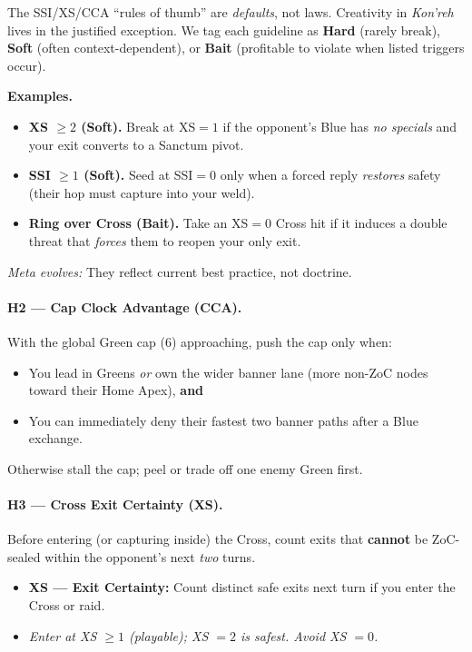 \documentclass[11pt]{article}
\begin{document}
\begin{tcolorbox}[enhanced,breakable,title={Designer Note — Heuristics Are Handles, Not Handcuffs},
  colback=white,colframe=royal,boxrule=0.8pt]
\small
The SSI/XS/CCA “rules of thumb” are \emph{defaults}, not laws. Creativity in \textit{Kon'reh} lives in the justified exception.
We tag each guideline as \textbf{Hard} (rarely break), \textbf{Soft} (often context-dependent), or \textbf{Bait} (profitable to violate when listed triggers occur).

\textbf{Examples.}
\begin{itemize}[leftmargin=1.2em,itemsep=0.2em]
  \item \textbf{XS $\ge 2$ (Soft).} Break at XS$=1$ if the opponent’s Blue has \emph{no specials} and your exit converts to a Sanctum pivot.
  \item \textbf{SSI $\ge 1$ (Soft).} Seed at SSI$=0$ only when a forced reply \emph{restores} safety (their hop must capture into your weld).
  \item \textbf{Ring over Cross (Bait).} Take an XS$=0$ Cross hit if it induces a double threat that \emph{forces} them to reopen your only exit.
\end{itemize}
\emph{Meta evolves:} They reflect current best practice, not doctrine.
\end{tcolorbox}

\paragraph{H2 — Cap Clock Advantage (CCA).}
With the global Green cap (6) approaching, push the cap only when:
\begin{itemize}
  \item You lead in Greens \emph{or} own the wider banner lane (more non-ZoC nodes toward their Home Apex), \textbf{and}
  \item You can immediately deny their fastest two banner paths after a Blue exchange.
\end{itemize}
Otherwise stall the cap; peel or trade off one enemy Green first.

\paragraph{H3 — Cross Exit Certainty (XS).}
Before entering (or capturing inside) the Cross, count exits that \textbf{cannot} be ZoC-sealed within the opponent’s next \emph{two} turns.
\begin{itemize}
  \item \textbf{XS — Exit Certainty:} Count distinct safe exits next turn if you enter the Cross or raid. 
  \item \emph{Enter at XS $\ge 1$ (playable); XS $=2$ is safest. Avoid XS $=0$.}
\end{itemize}
\end{document}
